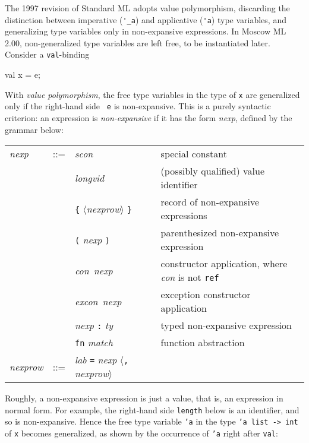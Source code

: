 \documentclass[fleqn,a4paper]{article}
\begin{document}
The 1997 revision of Standard ML \cite{Milner:1997:TheDefinition}
adopts value polymorphism, discarding the distinction between
imperative (\verb#'_a#) and applicative (\verb#'a#) type variables,
and generalizing type variables only in non-expansive expressions.  In
Moscow ML 2.00, non-generalized type variables are left free, to be
instantiated later.  Consider a {\tt val}-binding

\begin{program}
val x = e;
\end{program}

\noindent With {\em value polymorphism\/}, the free type variables in
the type of {\tt x} are generalized only if the right-hand side {\tt
  e} is non-expansive.  This is a purely syntactic criterion: an
expression is {\em non-expansive\/} if it has the form {\it nexp\/},
defined by the grammar below:

\begin{quot} 
\begin{tabular}{@{}lcll}
{\it nexp} & ::= & {\it scon\/}  & special constant\\
&& {\it longvid\/} & (possibly qualified) value identifier\\           
&& \verb#{# $\langle${\it nexprow\/}$\rangle$ \verb#}# & record of
non-expansive expressions\\
&& \verb#(# {\it nexp\/} \verb#)# & parenthesized non-expansive expression\\
&& {\it con\/}\ {\it nexp\/} & constructor application, where {\it con\/}
is not {\tt ref}\\
&& {\it excon\/}\ {\it nexp\/} & exception constructor application\\
&& {\it nexp} \verb#:# {\it ty\/} & typed non-expansive expression\\
&& \verb#fn# {\it match} & function abstraction\\[2ex]

{\it nexprow} & ::= & {\it lab\/} \verb#=# {\it nexp\/}
$\langle$\verb#,# {\it nexprow\/}$\rangle$  \\
\end{tabular}
\end{quot}

\noindent Roughly, a non-expansive expression is just a value, that
is, an expression in normal form.  For example, the right-hand side
{\tt length} below is an identifier, and so is non-expansive.  Hence
the free type variable {\tt 'a} in the type {\tt 'a list -> int} of
{\tt x} becomes generalized, as shown by the occurrence of \texttt{'a}
right after \texttt{val}:
\end{document}
